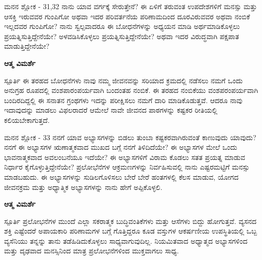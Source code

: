 \begin{mananam}{\mananamfont ಮನನ ಶ್ಲೋಕ - \textenglish{31,32}}
\footnotesize \mananamtext ನಾನು ಯಾವ ವರ್ಗಕ್ಕೆ ಸೇರುತ್ತೇನೆ? ಈ ಏಳಿಗೆ ತರುವಂತ ಉಪದೇಶಗಳಿಗೆ ಮನಸ್ಸು ಮತ್ತು ಆಸಕ್ತಿ ಇರುವವರ ಗುಂಪಿಗೋ ಅಥವಾ ಇದರ ಪರಿವರ್ತನೆಯ ಪರಿಣಾಮದಿಂದ ದೂರವಿರುವವರ ಅಥವಾ ನಂಬಿಕೆ ಇಲ್ಲದವರ ಗುಂಪಿಗೋ? ನಾನು ಸ್ವಲ್ಪವಾದರೂ ಈ ಬೋಧನೆಗಳನ್ನು ಅಧ್ಯಯನ ಮಾಡಿ ಅರ್ಥಮಾಡಿಕೊಳ್ಳಲು ಪ್ರಯತ್ನಿಸುತ್ತಿದ್ದೇನೆಯೇ? ಅಳವಡಿಸಿಕೊಳ್ಳಲು ಪ್ರಯತ್ನಿಸುತ್ತಿದ್ದೇನೆಯೇ? ಅಥವಾ ಇದರ ವಿರುದ್ಧವಾಗಿ ಪಕ್ಷಪಾತ ಮಾಡುತ್ತಿದ್ದೇನೆಯೇ?
\end{mananam}
\WritingHand\enspace\textbf{ಆತ್ಮ ವಿಮರ್ಶೆ}\\
\begin{inspiration}{\mananamfont ಸ್ಪೂರ್ತಿ}
\footnotesize \mananamtext ಈ ತರಹದ ಬೋಧನೆಗಳು ನಾವು ನಮ್ಮ ಜೀವನವನ್ನು ಸರಿಯಾದ ಕ್ರಮದಲ್ಲಿ ನಡೆಸಲು ನಮಗೆ ಒಂದು ಅನುಗ್ರಹ ರೂಪದಲ್ಲಿ ವಂಶಪಾರಂಪರ್ಯವಾಗಿ ಬಂದಂತಹ ನಂಬಿಕೆ. ಈ ತರಹದ ನಂಬಿಕೆಯು ವಂಶಪರಂಪರ್ಯವಾಗಿ ಬಂದಿರದಿದ್ದಲ್ಲಿ ಈ ಸನಾತನ ಗ್ರಂಥಗಳು ಇದನ್ನು ಪರೀಕ್ಷಿಸಲು ನಮಗೆ ದಾರಿ ಮಾಡಿಕೊಡುತ್ತವೆ. ಆದರೂ ನಾವು ಇದಾವುದನ್ನು ಮಾಡಲು ವಿಫಲರಾದರೆ ಆಮೇಲೆ ನಾವೇ ಜೀವನದ ಪಾಠಗಳನ್ನು ಕಷ್ಟಕರ ರೀತಿಯಲ್ಲಿ ಕಲಿಯಬೇಕಾಗುತ್ತದೆ. 
\end{inspiration}
\newpage

\begin{mananam}{\mananamfont ಮನನ ಶ್ಲೋಕ - \textenglish{33}}
\footnotesize \mananamtext ನನಗೆ ಯಾವ ಅಭ್ಯಾಸಗಳನ್ನು ಬಿಡಲು ತುಂಬಾ ಕಷ್ಟಕರವಾಗಿರುವಂತೆ ಕಾಣುವುದು ಯಾವುದು? ನನಗೆ ಈ ಅಭ್ಯಾಸಗಳ ಋಣಾತ್ಮಕವಾದ ಮುಖದ ಬಗ್ಗೆ ನನಗೆ ತಿಳಿದಿದೆಯೇ? ಈ ಅಭ್ಯಾಸಗಳ ಮೇಲೆ ಒಂದು ಭಾವನಾತ್ಮಕವಾದ ಅವಲಂಬನೆಯೂ ಇದೆಯೇ? ಈ ಅಭ್ಯಾಸಗಳಿಗೆ ವಿರಾಮ ಕೊಡಲು ಸತತ ಪ್ರಯತ್ನ ಮಾಡುವ ನಿರ್ಧಾರ ಕೈಗೊಳ್ಳುತ್ತಿದ್ದೇನೆಯೇ? ಪ್ರಲೋಭೆನೆಗಳ ಆಕ್ರಮಣಗಳನ್ನು ನಿರ್ವಹಿಸುವಲ್ಲಿ ನಾನು ಎಷ್ಟರಮಟ್ಟಿಗೆ ಮನಸ್ಸು ಮಾಡಬಹುದು. ಈ ಅಭ್ಯಾಸಗಳನ್ನು ಸುಡಿಲಗೊಳಿಸಲು ಬೇರೆ ಬೇರೆ ಹಂತಗಳಲ್ಲಿ ಕೆಲಸ ಮಾಡುವ, ಯೋಗದ ಜೀವನಕ್ರಮ ಮತ್ತು ಅಧ್ಯಾತ್ಮಿಕ ಅಭ್ಯಾಸಗಳನ್ನು ನಾನು ಹೇಗೆ ಅಪ್ಪಿಕೊಳ್ಳಲಿ.
\end{mananam}
\WritingHand\enspace\textbf{ಆತ್ಮ ವಿಮರ್ಶೆ}\\
\begin{inspiration}{\mananamfont ಸ್ಪೂರ್ತಿ}
\footnotesize \mananamtext ಪ್ರಲೋಭನೆಗಳ ಮುಂದೆ ಎಲ್ಲಾ ಸಕರಾತ್ಮಕ ಬುದ್ಧಿವಂತಿಕೆಗಳು ಮತ್ತು ಆಸೆಗಳು ಬಿದ್ದು ಹೋಗುತ್ತವೆ. ವ್ಯಸನದ ಶಕ್ತಿ ಎಷ್ಟೆಂದರೆ ಅಪಾಯಕಾರಿ ಪರಿಣಾಮಗಳ ಬಗ್ಗೆ ಗೊತ್ತಿದ್ದರೂ ಕೂಡ ವಸ್ತುಗಳ ಆಕರ್ಷಣೀಯ ಉಪಸ್ಥಿತಿಯಲ್ಲಿ ಒಬ್ಬ ವ್ಯಸೆನಿಯು ತನ್ನನ್ನು ತಾನು ತಡೆಹಿಡಿದುಕೊಳ್ಳಲು ಸಾಧ್ಯವಾಗುವುದಿಲ್ಲ. ನಿಯಮಿತವಾದ ಅಧ್ಯಾತ್ಮದ ಅಭ್ಯಾಸಗಳಿಂದ ಮತ್ತು ದೃಢವಾದ ಮನಸ್ಸಿನಿಂದ ಮಾತ್ರ ಪ್ರಲೋಭನೆಗಳಿಂದ ಮುಕ್ತವಾಗಲು ಸಾಧ್ಯ.
\end{inspiration}
\newpage

